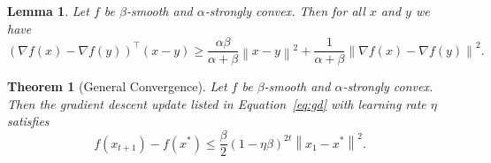 \documentclass{article}
\newcommand{\norm}[1]{\left\| #1 \right\| }
\newtheorem{lemma}{Lemma}
\newtheorem{theorem}{Theorem}
\theoremstyle{definition}
\begin{document}
\begin{lemma}
    Let $f$ be $\beta$-smooth and $\alpha$-strongly convex. Then for all $x$ and
    $y$ we have
    \begin{equation}
        {(\nabla f(x) - \nabla f(y))}^\intercal (x - y) \geq
        \frac{\alpha\beta}{\alpha + \beta} \norm{x - y}^2 + \frac{1}{\alpha +
        \beta} \norm{\nabla f(x) - \nabla f(y)}^2.
    \end{equation}
\end{lemma}

\begin{theorem}[General Convergence]
    Let $f$ be $\beta$-smooth  and $\alpha$-strongly convex. Then the
    gradient descent update listed in Equation~\ref{eq:gd} with learning rate
    $\eta$ satisfies
    \begin{equation}
        f(x_{t+1}) - f(x^*) \leq \frac{\beta}{2} {\left( 1 - \eta \beta
        \right)}^{2t} \norm{x_1 - x^*}^2.
    \end{equation}
\end{theorem}
\end{document}

